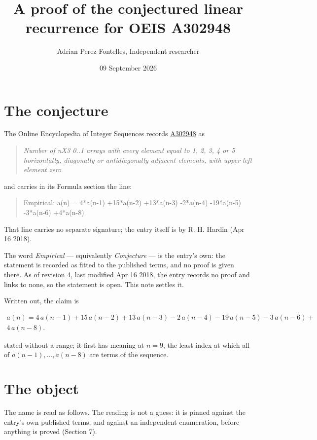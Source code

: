 \documentclass[11pt]{article}
\title{A proof of the conjectured linear recurrence for OEIS A302948}
\author{Adrian Perez Fontelles, Independent researcher}
\date{09 September 2026}
\theoremstyle{definition}
\begin{document}
\maketitle
\section{The conjecture}

The Online Encyclopedia of Integer Sequences records \href{https://oeis.org/A302948}{A302948} as

\begin{quote}\itshape Number of nX3 0..1 arrays with every element equal to 1, 2, 3, 4 or 5 horizontally, diagonally or antidiagonally adjacent elements, with upper left element zero\end{quote}

and carries in its Formula section the line:

\begin{quote}\ttfamily Empirical: a(n) = 4*a(n-1) +15*a(n-2) +13*a(n-3) -2*a(n-4) -19*a(n-5) -3*a(n-6) +4*a(n-8)\end{quote}

That line carries no separate signature; the entry itself is by R. H. Hardin (Apr 16 2018).

The word {\itshape Empirical} --- equivalently {\itshape Conjecture} --- is the entry's own: the statement is recorded as fitted to the published terms, and no proof is given there. As of revision 4, last modified Apr 16 2018, the entry records no proof and links to none, so the statement is open. This note settles it.

Written out, the claim is

\begin{multline*} a(n) = 4\,a(n-1) + 15\,a(n-2) + 13\,a(n-3) - 2\,a(n-4) - 19\,a(n-5) - 3\,a(n-6) + \\ 4\,a(n-8). \end{multline*}

stated without a range; it first has meaning at $n = 9$, the least index at which all of $a(n-1),\dots,a(n-8)$ are terms of the sequence.

\section{The object}

The name is read as follows. The reading is not a guess: it is pinned against the entry's own published terms, and against an independent enumeration, before anything is proved (Section 7).
\end{document}

